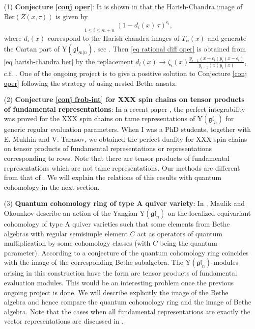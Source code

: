 \documentclass[11pt,reqno]{amsart}
\numberwithin{equation}{section}
\theoremstyle{definition}
\theoremstyle{remark}
\newcommand{\beq}{\begin{equation}}
\newcommand{\eeq}{\end{equation}}
\newcommand{\gl}{\mathfrak{gl}}
\newcommand{\lle}{\leqslant}
\newcommand{\YglMN}{\mathrm{Y}(\mathfrak{gl}_{m|n})}
\begin{document}
(1) {\bf Conjecture \ref{conj oper}}: It is shown in \cite{LM:2020} that the Harish-Chandra image of $\mathrm{Ber}(Z(x,\tau))$ is given by
\beq\label{eq harish-chandra ber}
\mathop{\overrightarrow\prod}\limits_{1\lle i\lle m+n}(1-d_i(x)\, \tau)^{\epsilon_i},
\eeq
where $d_i(x)$ correspond to the Harish-chandra images of $T_{ii}(x)$ and generate the Cartan part of $\YglMN$, see \cite{Gow:2007}. Then \eqref{eq rational diff oper} is obtained from \eqref{eq harish-chandra ber} by the replacement $d_i(x)\to \zeta_i(x)\frac{y_{i-1}(x+\epsilon_i)y_i(x-\epsilon_i)}{y_{i-1}(x)y_i(x)}$, c.f. \cite[Theorem 5.11]{FH:2015}. One of the ongoing project is to give a positive solution to Conjecture \ref{conj oper} following the strategy of \cite{MTV:2006} using nested Bethe ansatz.

(2) \textbf{Conjecture \ref{conj frob-int} for XXX spin chains on tensor products of fundamental representations}: In a recent paper \cite{IMGR:2021}, the perfect integrability was proved for the XXX spin chains on tame representations of $\mathrm{Y}(\gl_{n})$ for generic regular evaluation parameters. When I was a PhD students, together with E. Mukhin and V. Tarasov, we obtained the perfect duality for XXX spin chains on tensor products of fundamental representations or representations corresponding to rows. Note that there are tensor products of fundamental representations which are not tame representations.  Our methods are different from that of \cite{IMGR:2021}. We will explain the relations of this results with quantum cohomology in the next section.

(3) \textbf{Quantum cohomology ring of type A quiver variety}: In \cite{MO:2019}, Maulik and Okounkov describe an
action of the Yangian $\mathrm{Y}(\gl_n)$ on the localized equivariant cohomology of type A quiver varieties such that
some elements from Bethe algebras with regular semisimple element $C$ act as operators of quantum multiplication
by some cohomology classes (with $C$ being the quantum parameter). According to a conjecture
of \cite{MO:2019} the quantum cohomology ring coincides with the image of the corresponding Bethe
subalgebra. The $\mathrm{Y}(\gl_n)$-modules arising in this construction have the form are tensor products of fundamental evaluation modules. This would be an interesting problem
once the previous ongoing project is done. We will describe explicitly the image of the Bethe algebra and hence compare the quantum cohomology ring and the image of Bethe algebra. Note that the cases when all fundamental representations are exactly the vector representations are discussed in \cite{GRTV:2012}. 




\end{document}
